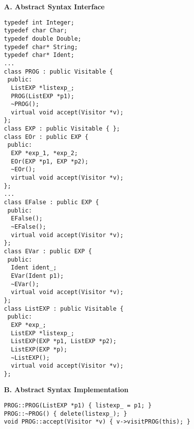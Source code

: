 \begin{figure}
\begin{boxedminipage}[t]{\textwidth}
\begin{minipage}[l]{0.5\textwidth}
\textbf{A. Abstract Syntax Interface}
\scriptsize
\begin{verbatim}
typedef int Integer;
typedef char Char;
typedef double Double;
typedef char* String;
typedef char* Ident;
...
class PROG : public Visitable {
 public:
  ListEXP *listexp_;
  PROG(ListEXP *p1);
  ~PROG();
  virtual void accept(Visitor *v);
};
class EXP : public Visitable { };
class EOr : public EXP {
 public:
  EXP *exp_1, *exp_2;
  EOr(EXP *p1, EXP *p2);
  ~EOr();
  virtual void accept(Visitor *v);
};
...
class EFalse : public EXP {
 public:
  EFalse();
  ~EFalse();
  virtual void accept(Visitor *v);
};
class EVar : public EXP {
 public:
  Ident ident_;
  EVar(Ident p1);
  ~EVar();
  virtual void accept(Visitor *v);
};
class ListEXP : public Visitable {
 public:
  EXP *exp_;
  ListEXP *listexp_;
  ListEXP(EXP *p1, ListEXP *p2);
  ListEXP(EXP *p);
  ~ListEXP();
  virtual void accept(Visitor *v);
};
\end{verbatim}
\normalsize
\textbf{B. Abstract Syntax Implementation}

\scriptsize
\begin{verbatim}
PROG::PROG(ListEXP *p1) { listexp_ = p1; }
PROG::~PROG() { delete(listexp_); }
void PROG::accept(Visitor *v) { v->visitPROG(this); }


\end{verbatim}
\end{minipage}
\end{boxedminipage}
\end{figure}

